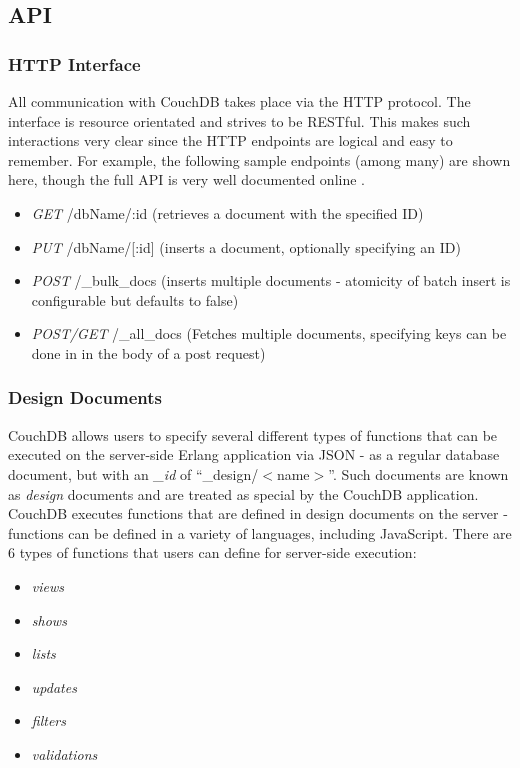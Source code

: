\subsection{API}
\subsubsection{HTTP Interface}
All communication with CouchDB takes place via the HTTP protocol. The interface is resource orientated and strives to be RESTful. This makes such interactions very clear since the HTTP endpoints are logical and easy to remember. For example, the following sample endpoints (among many) are shown here, though the full API is very well documented online \cite{couch-api}.

\begin{itemize}
    \item \textit{GET} /dbName/:id (retrieves a document with the specified ID)
    \item \textit{PUT} /dbName/[:id] (inserts a document, optionally specifying an ID)
    \item \textit{POST} /\_bulk\_docs (inserts multiple documents - atomicity of batch insert is configurable but defaults to false)
    \item \textit{POST/GET} /\_all\_docs (Fetches multiple documents, specifying keys can be done in in the body of a post request)
\end{itemize}

\subsubsection{Design Documents}
CouchDB allows users to specify several different types of functions that can be executed on the server-side Erlang application via JSON - as a regular database document, but with an \textit{\_id} of ``\_design/$<$name$>$''. Such documents are known as \textit{design} documents and are treated as special by the CouchDB application. CouchDB executes functions that are defined in design documents on the server - functions can be defined in a variety of languages, including JavaScript. There are 6 types of functions that users can define for server-side execution:

\begin{itemize}
    \item \textit{views}
    \item \textit{shows}
    \item \textit{lists}
    \item \textit{updates}
    \item \textit{filters}
    \item \textit{validations}
\end{itemize}


